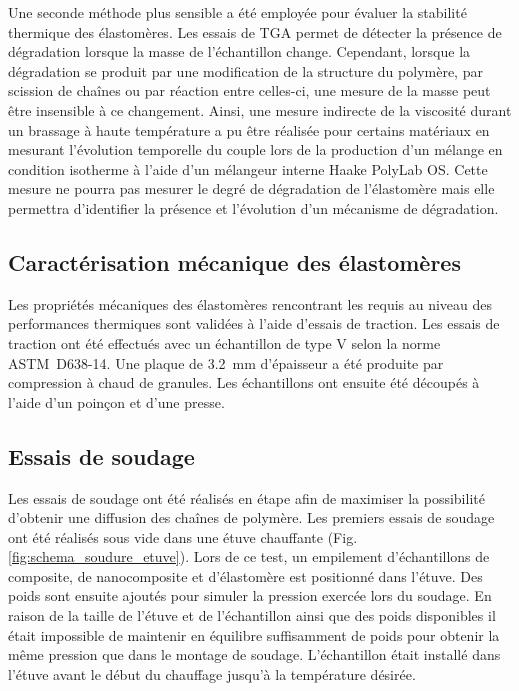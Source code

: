 Une seconde méthode plus sensible a été employée pour évaluer la stabilité thermique des élastomères. 
Les essais de TGA permet de détecter la présence de dégradation lorsque la masse de l'échantillon change. 
Cependant, lorsque la dégradation se produit par une modification de la structure du polymère, par scission de chaînes ou par réaction entre celles-ci, une mesure de la masse peut être insensible à ce changement. 
Ainsi, une mesure indirecte de la viscosité durant un brassage à haute température a pu être réalisée pour certains matériaux en mesurant l'évolution temporelle du couple lors de la production d'un mélange en condition isotherme à l'aide d'un mélangeur interne Haake PolyLab OS. 
Cette mesure ne pourra pas mesurer le degré de dégradation de l'élastomère mais elle permettra d'identifier la présence et l'évolution d'un mécanisme de dégradation. 

\subsection{Caractérisation mécanique des élastomères}

Les propriétés mécaniques des élastomères rencontrant les requis au niveau des performances thermiques sont validées à l'aide d'essais de traction. 
Les essais de traction ont été effectués avec un échantillon de type V selon la norme ASTM~D638-14. 
Une plaque de \SI{3.2}{\milli\metre} d'épaisseur a été produite par compression à chaud de granules. 
Les échantillons ont ensuite été découpés à l'aide d'un poinçon et d'une presse. 

\subsection{Essais de soudage}

Les essais de soudage ont été réalisés en étape afin de maximiser la possibilité d'obtenir une diffusion des chaînes de polymère. 
Les premiers essais de soudage ont été réalisés sous vide dans une étuve chauffante (Fig. \ref{fig:schema_soudure_etuve}). 
Lors de ce test, un empilement d'échantillons de composite, de nanocomposite et d'élastomère est positionné dans l'étuve. 
Des poids sont ensuite ajoutés pour simuler la pression exercée lors du soudage. 
En raison de la taille de l'étuve et de l'échantillon ainsi que des poids disponibles il était impossible de maintenir en équilibre suffisamment de poids pour obtenir la même pression que dans le montage de soudage. 
L'échantillon était installé dans l'étuve avant le début du chauffage jusqu'à la température désirée. 


